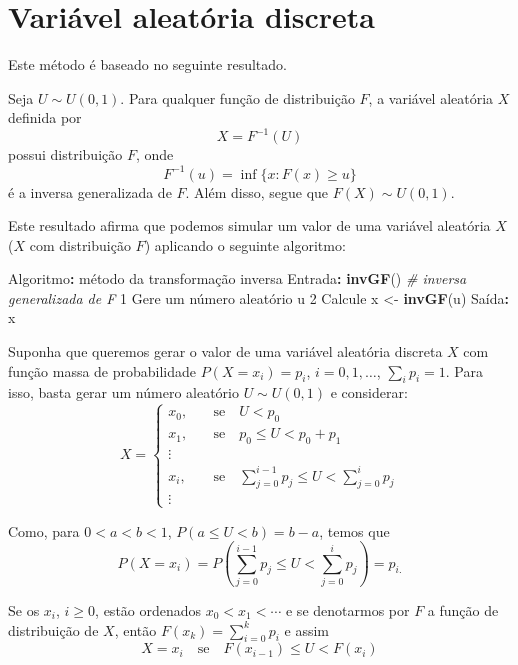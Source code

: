 \documentclass[
]{book}
\newenvironment{Shaded}{\begin{snugshade}}{\end{snugshade}}
\newcommand{\CommentTok}[1]{\textcolor[rgb]{0.56,0.35,0.01}{\textit{#1}}}
\newcommand{\DecValTok}[1]{\textcolor[rgb]{0.00,0.00,0.81}{#1}}
\newcommand{\FunctionTok}[1]{\textcolor[rgb]{0.13,0.29,0.53}{\textbf{#1}}}
\newcommand{\NormalTok}[1]{#1}
\newcommand{\OtherTok}[1]{\textcolor[rgb]{0.56,0.35,0.01}{#1}}
\newcommand{\SpecialCharTok}[1]{\textcolor[rgb]{0.81,0.36,0.00}{\textbf{#1}}}
\begin{document}
\section{Variável aleatória discreta}\label{variuxe1vel-aleatuxf3ria-discreta}

Este método é baseado no seguinte resultado.

Seja \(U\sim U(0,1)\). Para qualquer função de distribuição \(F\), a variável aleatória \(X\) definida por \[X = F^{-1}(U)\] possui distribuição \(F\), onde \[F^{-1}(u) = \inf\{x: F(x)\geq u\}\] é a inversa generalizada de \(F\). Além disso, segue que \(F(X)\sim U(0,1)\).

Este resultado afirma que podemos simular um valor de uma variável aleatória \(X\) (\(X\) com distribuição \(F\)) aplicando o seguinte algoritmo:

\begin{Shaded}
\begin{Highlighting}[]
\NormalTok{Algoritmo}\SpecialCharTok{:}\NormalTok{ método da transformação inversa}
\NormalTok{Entrada}\SpecialCharTok{:} \FunctionTok{invGF}\NormalTok{() }\CommentTok{\# inversa generalizada de F}
  \DecValTok{1}\NormalTok{ Gere um número aleatório u }
  \DecValTok{2}\NormalTok{ Calcule x }\OtherTok{\textless{}{-}} \FunctionTok{invGF}\NormalTok{(u)}
\NormalTok{Saída}\SpecialCharTok{:}\NormalTok{ x}
\end{Highlighting}
\end{Shaded}

Suponha que queremos gerar o valor de uma variável aleatória discreta
\(X\) com função massa de probabilidade \(P(X = x_{i}) = p_{i}\),
\(i=0,1,\ldots\), \(\sum_{i}p_{i}=1\). Para isso, basta gerar um número
aleatório \(U \sim U(0,1)\) e considerar: \[X = \begin{cases}
x_{0},& \quad \text{se} \quad U<p_{0} \\
x_{1},& \quad \text{se} \quad p_{0}\leq U <p_{0}+p_{1}\\
\vdots& \\
x_{i},& \quad \text{se} \quad \sum_{j=0}^{i-1}p_{j}\leq U < \sum_{j=0}^{i}p_{j} \\
\vdots
\end{cases}\]

Como, para \(0<a<b<1\), \(P(a\leq U<b)=b-a\), temos que
\[P(X=x_{i}) = P\left( \sum_{j=0}^{i-1}p_{j} \leq U < \sum_{j=0}^{i}p_{j} \right) = p_{i.}\]

Se os \(x_{i}\), \(i\geq 0\), estão ordenados \(x_{0}<x_{1}<\cdots\) e se
denotarmos por \(F\) a função de distribuição de \(X\), então
\(F(x_{k})=\sum_{i=0}^{k}p_{i}\) e assim
\[X = x_{i} \quad \text{se} \quad F(x_{i-1})\leq U < F(x_{i})\]
\end{document}
